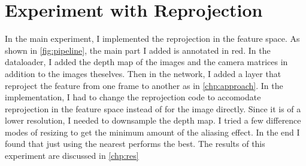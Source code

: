 \section{Experiment with Reprojection}
In the main experiment, I implemented the reprojection in the feature space. As shown in \ref{fig:pipeline}, the main part I added is annotated in red. In the dataloader, I added the depth map of the images and the camera matrices in addition to the images theselves. Then in the network, I added a layer that reproject the feature from one frame to another as in \ref{chp:approach}. In the implementation, I had to change the reprojection code to accomodate reprojection in the feature space instead of for the image directly. Since it is of a lower resolution, I needed to downsample the depth map. I tried a few difference modes of resizing to get the minimum amount of the aliasing effect. In the end I found that just using the nearest performs the best. The results of this experiment are discussed in \ref{chp:res}

